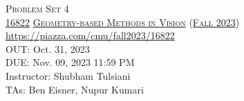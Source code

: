 \documentclass[11pt,addpoints,answers]{exam}
\title{\textsc{\hwName}} %
\author{}
\date{}
\date{}
\numberwithin{equation}{section} %
\numberwithin{figure}{section} %
\numberwithin{table}{section} %
\newcommand{\courseNum}{\href{https://geometric3d.github.io}{16822}}
\newcommand{\courseName}{\href{https://geometric3d.github.io}{Geometry-based Methods in Vision}}
\newcommand{\courseSem}{\href{https://geometric3d.github.io}{Fall 2023}}
\newcommand{\courseUrl}{\url{https://piazza.com/cmu/fall2023/16822}}
\newcommand{\hwNum}{Problem Set 4}
\newcommand{\hwTopic}{N-view Geometry}
\newcommand{\outDate}{Oct. 31, 2023}
\newcommand{\dueDate}{Nov. 09, 2023 11:59 PM}
\newcommand{\instructorName}{Shubham Tulsiani}
\newcommand{\taNames}{Ben Eisner, Nupur Kumari}
\begin{document}
\section*{}
\begin{center}
  \textsc{\LARGE \hwNum} \\
  \vspace{1em}
  \textsc{\large \courseNum{} \courseName{} (\courseSem)} \\
  \courseUrl\\
  \vspace{1em}
  OUT: \outDate \\
  DUE: \dueDate \\
  Instructor: \instructorName \\
  TAs: \taNames
\end{center}
\end{document}
